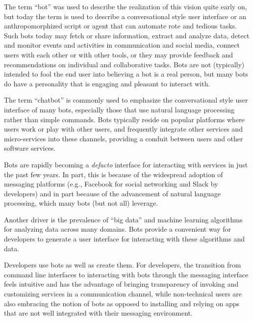 \documentclass{sig-alternate}
\begin{document}
The term ``bot'' was used to describe the realization of this vision quite early on, but today the term is used to describe a conversational style user interface or an anthropomorphized script or agent that can automate rote and tedious tasks.  Such bots today may fetch or share information, extract and analyze data, detect and monitor events and activities in communication and social media, connect users with each other or with other tools, or they may provide feedback and recommendations on individual and collaborative tasks. 
Bots are not (typically) intended to fool the end user into believing a bot is a real person, but many bots do have a personality that is engaging and pleasant to interact with. 

The term ``chatbot'' is commonly used to emphasize the conversational style user interface of many bots, especially those that use natural language processing rather than simple commands.  Bots typically reside on popular platforms where users work or play with other users, and frequently integrate other services and micro-services into these channels, providing a conduit between users and other software services.  

Bots are rapidly becoming a \emph{defacto} interface for interacting with services in just the past few years.  In part, this is because of the widespread adoption of messaging platforms (e.g., Facebook for social networking and Slack by developers) and in part because of the advancement of natural language processing, which many bots (but not all) leverage.

Another driver is the prevalence of ``big data'' and machine learning algorithms for analyzing data across many domains.  Bots provide a convenient way for developers to generate a user interface for interacting with these algorithms and data. 

Developers use bots as well as create them. For developers, the transition from command line interfaces to interacting with bots through the messaging interface feels intuitive and has the advantage of bringing transparency of invoking and customizing services in a communication channel, while non-technical users are also embracing the notion of bots as opposed to installing and relying on apps that are not well integrated with their messaging environment.  
\end{document}
